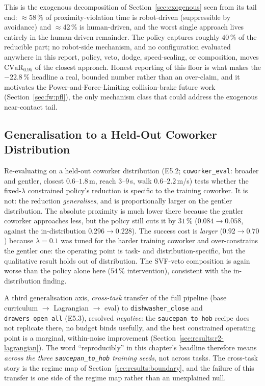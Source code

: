 \documentclass[11pt,a4paper]{report}
\newcommand{\cvar}{\ensuremath{\mathrm{CVaR}}}
\begin{document}
This is the exogenous decomposition of
Section~\ref{sec:exogenous} seen from its tail end:
$\approx$58\,\% of proximity-violation time is robot-driven (suppressible by
avoidance) and $\approx$42\,\% is human-driven, and the worst single
approach lives entirely in the human-driven remainder. The policy
captures roughly $40\,\%$ of the reducible part; no robot-side
mechanism, and no configuration evaluated anywhere in this report,
policy, veto, dodge, speed-scaling, or composition, moves
$\cvar_{0.95}$ of the closest approach. Honest reporting of this
floor is what makes the $-22.8\,\%$ headline a real, bounded number
rather than an over-claim, and it motivates the
Power-and-Force-Limiting collision-brake future work
(Section~\ref{sec:fw:pfl}), the only mechanism class that could
address the exogenous near-contact tail.

\subsection{Generalisation to a Held-Out Coworker Distribution}
\label{sec:results:ood}

Re-evaluating on a held-out coworker distribution (E5.2;
\texttt{coworker\_eval}: broader and gentler, closest
$0.6$--$1.8$\,m, reach $3$--$9$\,s, walk $0.6$--$2.2$\,m/s) tests
whether the fixed-$\lambda$ constrained policy's reduction is specific to the training coworker.
It is not: the reduction \emph{generalises}, and is proportionally
larger on the gentler distribution. The absolute proximity is much
lower there because the gentler coworker approaches less, but the
policy still cuts it by $31\,\%$ ($0.084 \rightarrow 0.058$, against
the in-distribution $0.296 \rightarrow 0.228$). The success cost is
\emph{larger} ($0.92 \rightarrow 0.70$) because $\lambda = 0.1$ was
tuned for the harder training coworker and over-constrains the
gentler one: the operating point is task- and distribution-specific,
but the qualitative result holds out of distribution. The SVF-veto
composition is again worse than the policy alone here ($54\,\%$
intervention), consistent with the in-distribution finding.

A third generalisation axis, \emph{cross-task} transfer of the full
pipeline (base curriculum $\rightarrow$ Lagrangian $\rightarrow$
eval) to \texttt{dishwasher\_close} and \texttt{drawers\_open\_all}
(E5.3), resolved \emph{negative}: the \texttt{saucepan\_to\_hob}
recipe does not replicate there, no budget binds usefully, and the best constrained
operating point is a marginal, within-noise improvement
(Section~\ref{sec:results:r2-lagrangian}). The word
``reproducibly'' in this chapter's headline therefore means
\emph{across the three \texttt{saucepan\_to\_hob} training seeds}, not across tasks.
The cross-task story is the regime map of
Section~\ref{sec:results:boundary}, and the failure of this transfer
is one side of the regime map rather than an unexplained null.
\end{document}

